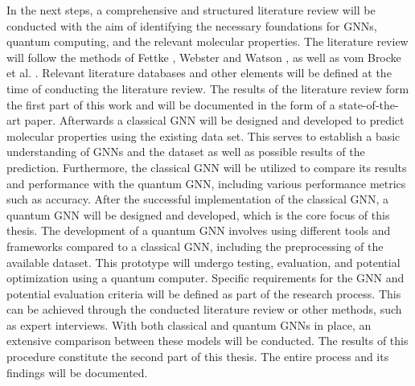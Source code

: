 In the next steps, a comprehensive and structured literature review will be conducted with the aim of identifying the necessary foundations for GNNs, quantum computing, and the relevant molecular properties. The literature review will follow the methods of Fettke \cite{fettke_state---art_2006}, Webster and Watson \cite{webster_analyzing_2002}, as well as vom Brocke et al. \cite{vom_brocke_reconstructing_nodate}. Relevant literature databases and other elements
will be defined at the time of conducting the literature review. The results of the literature review form the first part of this work and will be documented in the form of a state-of-the-art paper.
Afterwards a classical GNN will be designed and developed to predict molecular properties using the existing data set. This serves to establish a basic understanding of GNNs and the dataset as well as possible results of the prediction. Furthermore, the classical GNN will be utilized to compare its results and performance with the quantum GNN, including various performance metrics such as accuracy.
After the successful implementation of the classical GNN, a quantum GNN will be designed and developed, which is the core focus of this thesis. The development of a quantum GNN involves using different tools and frameworks compared to a classical GNN, including the preprocessing of the available dataset. This prototype will undergo testing, evaluation, and potential optimization using a quantum computer. Specific requirements for the GNN and potential evaluation criteria will be defined as part of the research process. This can be achieved through the conducted literature review or other methods, such as expert interviews. With both classical and quantum GNNs in place, an extensive comparison between these models will be conducted. The results of this procedure constitute the second part of this thesis. The entire process and its findings will be documented.